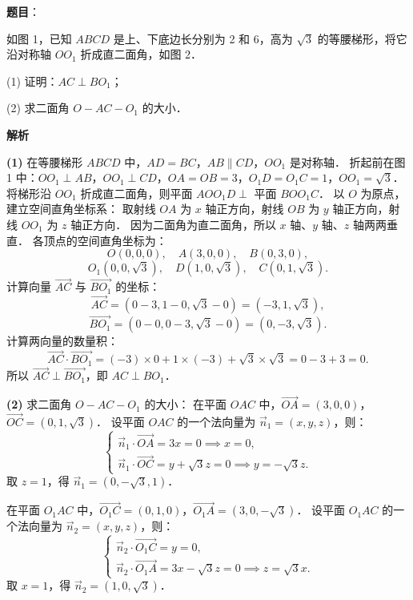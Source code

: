 \begin{answer}

\textbf{题目}：

如图 1，已知 $ABCD$ 是上、下底边长分别为 2 和 6，高为 $\sqrt{3}$ 的等腰梯形，将它沿对称轴 $OO_1$ 折成直二面角，如图 2．
\nopagebreak[4]
\begin{center}\end{center}
\nopagebreak[4]
(1) 证明：$AC \perp BO_1$；

(2) 求二面角 $O - AC - O_1$ 的大小．

\textbf{解析}

\textbf{(1)}
在等腰梯形 $ABCD$ 中，$AD = BC$，$AB \parallel CD$，$OO_1$ 是对称轴．
折起前在图 1 中：$OO_1 \perp AB$，$OO_1 \perp CD$，$OA = OB = 3$，$O_1D = O_1C = 1$，$OO_1 = \sqrt{3}$．
将梯形沿 $OO_1$ 折成直二面角，则平面 $AOO_1D \perp$ 平面 $BOO_1C$．
以 $O$ 为原点，建立空间直角坐标系：
取射线 $OA$ 为 $x$ 轴正方向，射线 $OB$ 为 $y$ 轴正方向，射线 $OO_1$ 为 $z$ 轴正方向．
因为二面角为直二面角，所以 $x$ 轴、$y$ 轴、$z$ 轴两两垂直．
各顶点的空间直角坐标为：
\nopagebreak[4]
\[
O(0, 0, 0), \quad A(3, 0, 0), \quad B(0, 3, 0),
\]
\nopagebreak[4]
\[
O_1(0, 0, \sqrt{3}), \quad D(1, 0, \sqrt{3}), \quad C(0, 1, \sqrt{3}).
\]
计算向量 $\vec{AC}$ 与 $\vec{BO_1}$ 的坐标：
\nopagebreak[4]
\[
\vec{AC} = (0 - 3, 1 - 0, \sqrt{3} - 0) = (-3, 1, \sqrt{3}),
\]
\nopagebreak[4]
\[
\vec{BO_1} = (0 - 0, 0 - 3, \sqrt{3} - 0) = (0, -3, \sqrt{3}).
\]
计算两向量的数量积：
\nopagebreak[4]
\[
\vec{AC} \cdot \vec{BO_1} = (-3) \times 0 + 1 \times (-3) + \sqrt{3} \times \sqrt{3} = 0 - 3 + 3 = 0.
\]
所以 $\vec{AC} \perp \vec{BO_1}$，即 $AC \perp BO_1$．

\textbf{(2)}
求二面角 $O - AC - O_1$ 的大小：
在平面 $OAC$ 中，$\vec{OA} = (3, 0, 0)$，$\vec{OC} = (0, 1, \sqrt{3})$．
设平面 $OAC$ 的一个法向量为 $\vec{n}_1 = (x, y, z)$，则：
\nopagebreak[4]
\[
\begin{cases}
\vec{n}_1 \cdot \vec{OA} = 3x = 0 \implies x = 0, \\
\vec{n}_1 \cdot \vec{OC} = y + \sqrt{3}z = 0 \implies y = -\sqrt{3}z.
\end{cases}
\]
取 $z = 1$，得 $\vec{n}_1 = (0, -\sqrt{3}, 1)$．

在平面 $O_1AC$ 中，$\vec{O_1C} = (0, 1, 0)$，$\vec{O_1A} = (3, 0, -\sqrt{3})$．
设平面 $O_1AC$ 的一个法向量为 $\vec{n}_2 = (x, y, z)$，则：
\nopagebreak[4]
\[
\begin{cases}
\vec{n}_2 \cdot \vec{O_1C} = y = 0, \\
\vec{n}_2 \cdot \vec{O_1A} = 3x - \sqrt{3}z = 0 \implies z = \sqrt{3}x.
\end{cases}
\]
取 $x = 1$，得 $\vec{n}_2 = (1, 0, \sqrt{3})$．


\end{answer}
